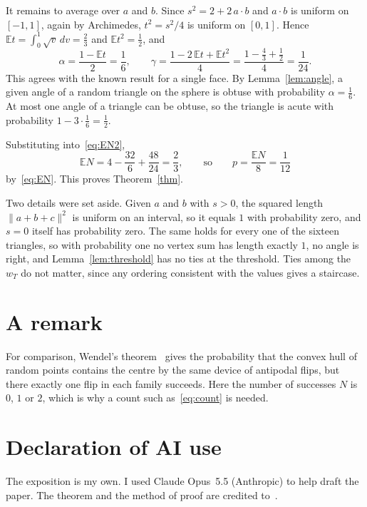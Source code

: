 \documentclass[11pt,a4paper]{article}
\newcommand{\E}{\mathbb{E}}
\begin{document}
It remains to average over $a$ and $b$. Since $s^2=2+2\,a\cdot b$ and
$a\cdot b$ is uniform on $[-1,1]$, again by Archimedes, $t^2=s^2/4$ is uniform
on $[0,1]$. Hence $\E t=\int_0^1\sqrt v\,dv=\frac23$ and $\E t^2=\frac12$, and
\[
 \alpha=\frac{1-\E t}{2}=\frac16,\qquad
 \gamma=\frac{1-2\,\E t+\E t^2}{4}=\frac{1-\frac43+\frac12}{4}=\frac1{24}.
\]
This agrees with the known result for a single face. By
Lemma~\ref{lem:angle}, a given angle of a random triangle on the sphere is
obtuse with probability $\alpha=\frac16$. At most one angle of a triangle
can be obtuse, so the triangle is acute with probability
$1-3\cdot\frac16=\frac12$.

Substituting into~\eqref{eq:EN2},
\[
 \E N=4-\frac{32}{6}+\frac{48}{24}=\frac23,
 \qquad\text{so}\qquad p=\frac{\E N}{8}=\frac1{12}
\]
by~\eqref{eq:EN}. This proves Theorem~\ref{thm}.

Two details were set aside. Given $a$ and $b$ with $s>0$, the squared
length $\|a+b+c\|^2$ is uniform on an interval, so it equals $1$ with
probability zero, and $s=0$ itself has probability zero. The same holds for
every one of the sixteen triangles, so with probability one no vertex sum
has length exactly $1$, no angle is right, and Lemma~\ref{lem:threshold}
has no ties at the threshold. Ties among the $w_T$ do not matter, since any
ordering consistent with the values gives a staircase.

\section{A remark}

For comparison, Wendel's theorem~\cite{Wendel} gives the probability that
the convex hull of random points contains the centre by the same device of
antipodal flips, but there exactly one flip in each family succeeds. Here
the number of successes $N$ is $0$, $1$ or $2$, which is why a count such
as~\eqref{eq:count} is needed.

\section*{Declaration of AI use}
The exposition is my own. I used Claude Opus~5.5 (Anthropic) to help
draft the paper. The theorem and the
method of proof are credited to~\cite{ChowChat}.
\end{document}
